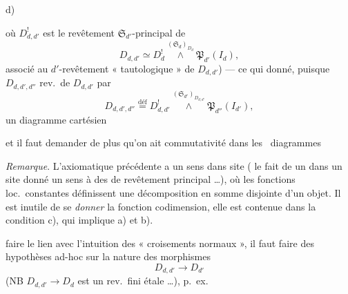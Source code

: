 \documentclass[11pt,a4paper]{article}
\begin{document}
d)


où $D^{!}_{d,d'}$ est le revêtement $\mathfrak{S}_{d'}$-principal de
\[
  D_{d,d'} \simeq D^{!}_d \overset{(\mathfrak{S}_d)_{D_d}}{\wedge} \mathfrak{P}_{d'}(I_d),
\]
associé au $d'$-revêtement « tautologique » de $D_{d,d'}$) --- ce qui
 donné, puisque $D_{d,d',d''}$ rev.\ de $D_{d,d'}$ par
\[
  D_{d,d',d''} \overset{\text{déf}}{=} D^{!}_{d,d'} \overset{(\mathfrak{S}_{d'})_{D_{d,d'}}}{\wedge} \mathfrak{P}_{d''}(I_{d'}),
\]
un \struck{\ill{}} diagramme cartésien



et il faut demander de plus qu'on ait commutativité dans les \
diagrammes



\emph{Remarque}. L'axiomatique précédente a un sens dans  site
(\struck{\ill{}} le fait de \ill{} un \ill{} dans un site donné un sens à
\ill{} des \ill{} de revêtement principal …), où les fonctions loc.\ constantes
\uncertain{à valeurs} \ill{} définissent une décomposition en somme disjointe d'un objet.
Il est inutile de se \emph{donner} la fonction codimension, elle est contenue dans
la condition c), qui implique a) et b).

  faire le lien avec l'intuition des « croisements normaux », il
faut faire des hypothèses ad-hoc sur la nature des morphismes
\[
  D_{d,d'} \longrightarrow D_{d'}
\]
(NB $D_{d,d'} \to D_d$ est un rev.\ fini étale …), p.~ex.
\end{document}
